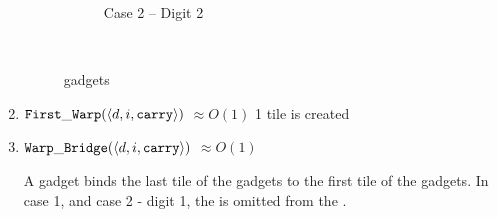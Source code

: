 \begin{enumerate}[label={--}]
\begin{figure}[H]
\begin{subfigure}[t]{0.2\textwidth}
                        \caption{\label{fig:warping/pre_warp_case2_digit2_msr} Case 2 -- Digit 2}
                    \end{subfigure}%
                    ~
                    \caption{\label{fig:pre_warp_gadgets} {\prewarp} gadgets }
                \end{figure}


            \item ${\tt First\_Warp} (\langle d, i, {\tt carry}\rangle)$ $\approx O(1)$
                1 tile is created

            \item ${\tt Warp\_Bridge}(\langle d, i, {\tt carry}\rangle)$ $\approx O(1)$

                A {\warpbridge} gadget binds the last tile of the {\firstwarp} gadgets to the
                first tile of the {\secondwarp} gadgets. In case 1, and case 2 - digit 1, the
                {\warpbridge} is omitted from the {\warpunit}.


\end{enumerate}
